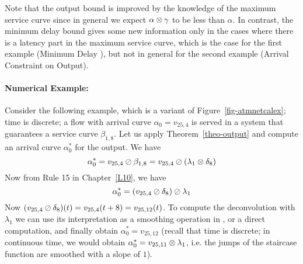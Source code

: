 Note that the output bound is improved by the knowledge of the
maximum service curve since in general we expect $\alpha \otimes
\gamma$ to be less than $\alpha$. In contrast, the minimum delay
bound gives some new information only in the cases where there is
a latency part in the maximum service curve, which is the case for
the first example (Minimum Delay ), but not in general for the
second example (Arrival Constraint on Output).

\paragraph{Numerical Example: }

%

Consider the following example, which is a variant of
Figure~\ref{fig-atmnetcalex}; time is discrete; a flow with arrival curve $\alpha_0=v_{25,4}$ is served in a system that guarantees a service curve $\beta_{1,8}$. Let us apply
Theorem~\ref{theo-output} and compute an arrival curve
$\alpha^*_0$ for the output. We have
 $$\alpha^*_0 =  v_{25,4} \oslash \beta_{1,8} =  v_{25,4} \oslash
 \left(
 \lambda_{1} \otimes \delta_8 \right)$$
 Now from Rule 15 in Chapter~\ref{L10}, we have
 $$\alpha^*_0 =  \left( v_{25,4} \oslash \delta_8 \right) \oslash
\lambda_{1} $$ Now $( v_{25,4} \oslash \delta_8)(t)=
v_{25,4}(t+8)= v_{25,12}(t)$. To compute the deconvolution with $\lambda_{1}$ we can use its interpretation as a smoothing operation in , or a direct computation, and finally obtain $\alpha^*_0=v_{25,12}$ (recall that time is discrete; in continuous time, we would obtain $\alpha^*_0=v_{25,11}\otimes \lambda_1$, i.e. the jumps of the staircase function are smoothed with a slope of $1$).


